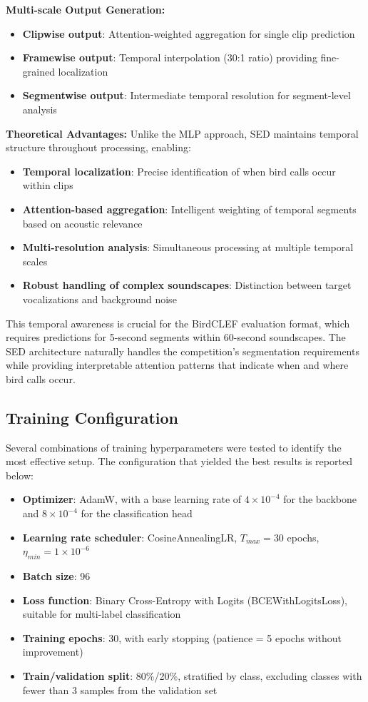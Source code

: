 \documentclass[ERTS, 2025]{ERTS}
\begin{document}
\textbf{Multi-scale Output Generation:}
\begin{itemize}
    \item \textbf{Clipwise output}: Attention-weighted aggregation for single clip prediction
    \item \textbf{Framewise output}: Temporal interpolation (30:1 ratio) providing fine-grained localization
    \item \textbf{Segmentwise output}: Intermediate temporal resolution for segment-level analysis
\end{itemize}

\textbf{Theoretical Advantages:}
Unlike the MLP approach, SED maintains temporal structure throughout processing, enabling:
\begin{itemize}
    \item \textbf{Temporal localization}: Precise identification of when bird calls occur within clips
    \item \textbf{Attention-based aggregation}: Intelligent weighting of temporal segments based on acoustic relevance
    \item \textbf{Multi-resolution analysis}: Simultaneous processing at multiple temporal scales
    \item \textbf{Robust handling of complex soundscapes}: Distinction between target vocalizations and background noise
\end{itemize}

This temporal awareness is crucial for the BirdCLEF evaluation format, which requires predictions for 5-second segments within 60-second soundscapes. The SED architecture naturally handles the competition's segmentation requirements while providing interpretable attention patterns that indicate when and where bird calls occur.

\subsection{Training Configuration}
Several combinations of training hyperparameters were tested to identify the most effective setup. The configuration that yielded the best results is reported below:

\begin{itemize}
    \item \textbf{Optimizer}: AdamW, with a base learning rate of $4 \times 10^{-4}$ for the backbone and $8 \times 10^{-4}$ for the classification head
    \item \textbf{Learning rate scheduler}: CosineAnnealingLR, $T_{max} = 30$ epochs, $\eta_{min} = 1 \times 10^{-6}$
    \item \textbf{Batch size}: 96
    \item \textbf{Loss function}: Binary Cross-Entropy with Logits (BCEWithLogitsLoss), suitable for multi-label classification
    \item \textbf{Training epochs}: 30, with early stopping (patience = 5 epochs without improvement)
    \item \textbf{Train/validation split}: 80\%/20\%, stratified by class, excluding classes with fewer than 3 samples from the validation set
\end{itemize}
\end{document}
